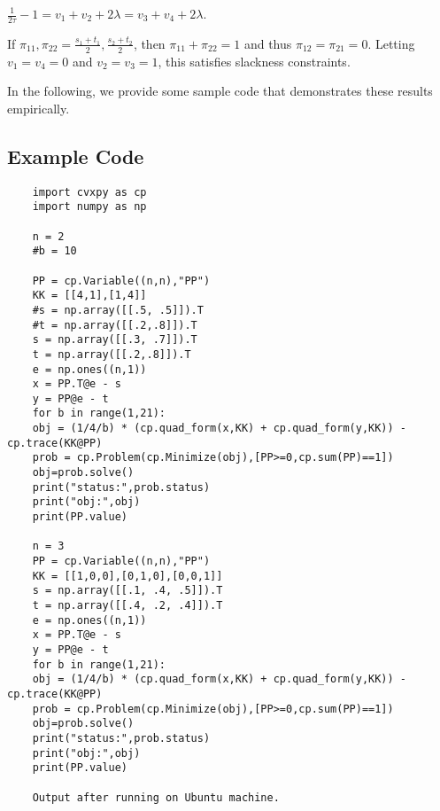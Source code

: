$\frac{1}{2\tau}-1=v_{1}+v_{2}+2\lambda=v_{3}+v_{4}+2\lambda$.

If $\pi_{11},\pi_{22}=\frac{s_{1}+t_{1}}{2},\frac{s_{2}+t_{2}}{2}$,
then $\pi_{11}+\pi_{22}=1$ and thus $\pi_{12}=\pi_{21}=0$. Letting
$v_{1}=v_{4}=0$ and $v_{2}=v_{3}=1$, this satisfies slackness constraints.

In the following, we provide some sample code that demonstrates these results empirically. 

\subsection*{Example Code}

\begin{lstlisting}
	import cvxpy as cp
	import numpy as np
	
	n = 2
	#b = 10
	
	PP = cp.Variable((n,n),"PP")
	KK = [[4,1],[1,4]]
	#s = np.array([[.5, .5]]).T
	#t = np.array([[.2,.8]]).T
	s = np.array([[.3, .7]]).T
	t = np.array([[.2,.8]]).T
	e = np.ones((n,1))
	x = PP.T@e - s
	y = PP@e - t
	for b in range(1,21):
	obj = (1/4/b) * (cp.quad_form(x,KK) + cp.quad_form(y,KK)) - cp.trace(KK@PP) 
	prob = cp.Problem(cp.Minimize(obj),[PP>=0,cp.sum(PP)==1])
	obj=prob.solve()
	print("status:",prob.status)
	print("obj:",obj)
	print(PP.value)
	
	n = 3
	PP = cp.Variable((n,n),"PP")
	KK = [[1,0,0],[0,1,0],[0,0,1]]
	s = np.array([[.1, .4, .5]]).T
	t = np.array([[.4, .2, .4]]).T
	e = np.ones((n,1))
	x = PP.T@e - s
	y = PP@e - t
	for b in range(1,21):
	obj = (1/4/b) * (cp.quad_form(x,KK) + cp.quad_form(y,KK)) - cp.trace(KK@PP) 
	prob = cp.Problem(cp.Minimize(obj),[PP>=0,cp.sum(PP)==1])
	obj=prob.solve()
	print("status:",prob.status)
	print("obj:",obj)
	print(PP.value)
	
	Output after running on Ubuntu machine.
	

\end{lstlisting}
